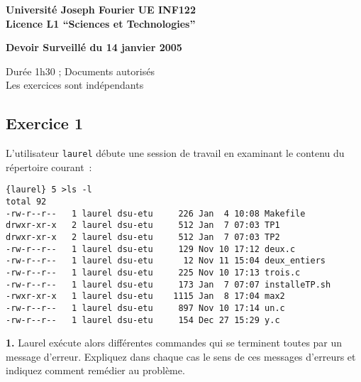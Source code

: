 \documentclass[10pt]{article}
\begin{document}
\thispagestyle{empty}

{\bf Université Joseph Fourier} 
\hfill {\bf UE INF122 } \\
{\bf Licence L1 ``Sciences et Technologies''} \\

\vspace{0.4cm}

\begin{center}
{\Large {\bf Devoir Surveillé du 14 janvier 2005}}\\
\end{center}

\vspace{0.4cm}

Durée 1h30 ; Documents autorisés \\
Les exercices sont indépendants 

\vspace{0.2cm}


\subsection*{Exercice 1}

L'utilisateur {\tt laurel} débute une session de travail en examinant 
le contenu du répertoire courant~: 
\begin{verbatim}
{laurel} 5 >ls -l
total 92
-rw-r--r--   1 laurel dsu-etu     226 Jan  4 10:08 Makefile
drwxr-xr-x   2 laurel dsu-etu     512 Jan  7 07:03 TP1
drwxr-xr-x   2 laurel dsu-etu     512 Jan  7 07:03 TP2
-rw-r--r--   1 laurel dsu-etu     129 Nov 10 17:12 deux.c
-rw-r--r--   1 laurel dsu-etu      12 Nov 11 15:04 deux_entiers
-rw-r--r--   1 laurel dsu-etu     225 Nov 10 17:13 trois.c
-rw-r--r--   1 laurel dsu-etu     173 Jan  7 07:07 installeTP.sh
-rwxr-xr-x   1 laurel dsu-etu    1115 Jan  8 17:04 max2
-rw-r--r--   1 laurel dsu-etu     897 Nov 10 17:14 un.c
-rw-r--r--   1 laurel dsu-etu     154 Dec 27 15:29 y.c
\end{verbatim}

{\bf 1.} Laurel exécute alors différentes commandes qui se terminent
toutes par un message d'erreur.
Expliquez dans chaque cas le sens de ces messages d'erreurs et indiquez
comment remédier au problème.
\end{document}
